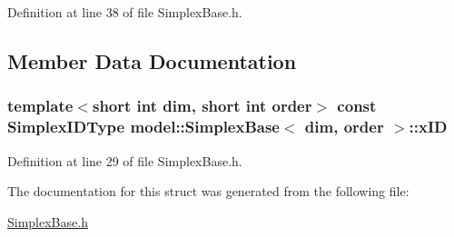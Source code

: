 Definition at line 38 of file Simplex\+Base.\+h.



\subsection{Member Data Documentation}
\hypertarget{structmodel_1_1_simplex_base_a477508d711a1cb001ccd895f88665a59}{}
\subsubsection[{x\+I\+D}]{\setlength{\rightskip}{0pt plus 5cm}template$<$short int dim, short int order$>$ const {\bf Simplex\+I\+D\+Type} {\bf model\+::\+Simplex\+Base}$<$ {\bf dim}, order $>$\+::x\+I\+D}\label{structmodel_1_1_simplex_base_a477508d711a1cb001ccd895f88665a59}


Definition at line 29 of file Simplex\+Base.\+h.



The documentation for this struct was generated from the following file\+:\begin{DoxyCompactItemize}
\item 
\hyperlink{_simplex_base_8h}{Simplex\+Base.\+h}\end{DoxyCompactItemize}
